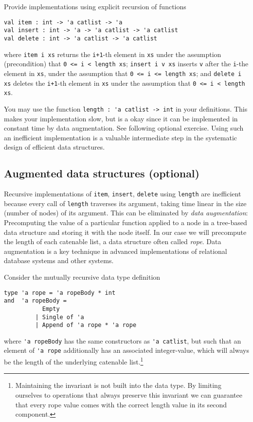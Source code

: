 \documentclass[a4paper,11pt]{article}
\begin{document}
Provide implementations using explicit recursion of functions
\begin{verbatim}
val item : int -> 'a catlist -> 'a
val insert : int -> 'a -> 'a catlist -> 'a catlist
val delete : int -> 'a catlist -> 'a catlist
\end{verbatim}
where \verb|item i xs| returns the \verb|i+1|-th element in \verb|xs| under the assumption (precondition) that \verb|0 <= i < length xs|;
\verb|insert i v xs| inserts \verb|v| after the \verb|i|-the element in \verb|xs|, under the assumption that \verb|0 <= i <= length xs|;
and \verb|delete i xs| deletes the \verb|i+1|-th element in \verb|xs| under the assumption that \verb|0 <= i < length xs|.

You may use the function \verb|length : 'a catlist -> int| in your definitions. This makes your implementation slow, but is a okay since it can be implemented in constant time by data augmentation. See following optional exercise.  Using such an inefficient implementation is a valuable intermediate step in the systematic design of efficient data structures.
 
\subsection{Augmented data structures (optional)}

Recursive implementations of \verb|item|, \verb|insert|, \verb|delete| using \verb|length| are inefficient because every call of \verb|length| traverses its argument, taking time linear in the size (number of nodes) of its argument.  This can be eliminated by \emph{data augmentation}: Precomputing the value of a particular function applied to a node in a tree-based data structure and storing it with the node itself.  In our case we will precompute the length of each catenable list, a data structure often called \emph{rope}.
Data augmentation is a key technique in advanced implementations of relational database systems and other systems.  

Consider the mutually recursive data type definition
\begin{verbatim}
type 'a rope = 'a ropeBody * int  
and  'a ropeBody = 
           Empty 
         | Single of 'a 
         | Append of 'a rope * 'a rope
\end{verbatim}
where \verb|'a ropeBody| has the same constructors as \verb|'a catlist|, but such that an element of \verb|'a rope| additionally has an associated integer-value, which will always be the length of the underlying catenable list.\footnote{Maintaining the invariant is not built into the data type. By limiting ourselves to operations that always preserve this invariant we can guarantee that every rope value comes with the correct length value in its second component.}
\end{document}
